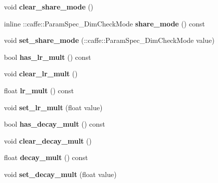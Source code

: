 \begin{DoxyCompactItemize}
void {\bfseries clear\+\_\+share\+\_\+mode} ()
\item 
\mbox{\label{classcaffe_1_1_param_spec_a7f1e2185898068c19eec4c4fd5b27967}} 
inline \+::caffe\+::\+Param\+Spec\+\_\+\+Dim\+Check\+Mode {\bfseries share\+\_\+mode} () const
\item 
\mbox{\label{classcaffe_1_1_param_spec_a9c5733a458338239d9ee0b35fe5bf9eb}} 
void {\bfseries set\+\_\+share\+\_\+mode} (\+::caffe\+::\+Param\+Spec\+\_\+\+Dim\+Check\+Mode value)
\item 
\mbox{\label{classcaffe_1_1_param_spec_a3be994a6c73c665f3a99ca5dcc3550b7}} 
bool {\bfseries has\+\_\+lr\+\_\+mult} () const
\item 
\mbox{\label{classcaffe_1_1_param_spec_a4f4a665e43f6b709764109aa3f0d6898}} 
void {\bfseries clear\+\_\+lr\+\_\+mult} ()
\item 
\mbox{\label{classcaffe_1_1_param_spec_ab5d8f850e5223c554f5235521badf0ae}} 
float {\bfseries lr\+\_\+mult} () const
\item 
\mbox{\label{classcaffe_1_1_param_spec_af414631f85cb8a877b4a9a0c80be90ff}} 
void {\bfseries set\+\_\+lr\+\_\+mult} (float value)
\item 
\mbox{\label{classcaffe_1_1_param_spec_a0518b412f7cc84426bb4d813d61f6c9e}} 
bool {\bfseries has\+\_\+decay\+\_\+mult} () const
\item 
\mbox{\label{classcaffe_1_1_param_spec_a937159ef0843638ee3b83684e75bcfb6}} 
void {\bfseries clear\+\_\+decay\+\_\+mult} ()
\item 
\mbox{\label{classcaffe_1_1_param_spec_aa91251c4a07b71374c4c0d29c6c2740a}} 
float {\bfseries decay\+\_\+mult} () const
\item 
\mbox{\label{classcaffe_1_1_param_spec_a8f2397c33a6f3745d3b2d34cefec08af}} 
void {\bfseries set\+\_\+decay\+\_\+mult} (float value)
\end{DoxyCompactItemize}
